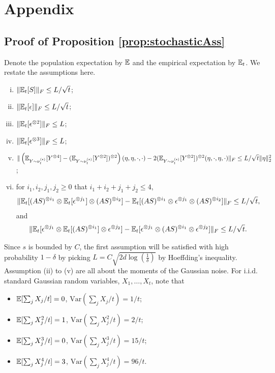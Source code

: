 \onecolumn

\section{Appendix}
\label{sec:Appendix}

\subsection{Proof of Proposition \ref{prop:stochasticAss}}
Denote the population expectation by $\mathbb{E}$ and the empirical expectation by $\mathbb{E}_t$. We restate the assumptions here.
\begin{enumerate}[(i).]
\vspace{-3mm}
\item $\| \mathbb{E}_t[S] \|_F\le L/\sqrt{t}$;
\item $\| \mathbb{E}_t[\epsilon] \|_F \le L/\sqrt{t}$;
\item $\| \mathbb{E}_t[\epsilon^{\otimes 2}] \|_F \le L$;
\item $\| \mathbb{E}_t[\epsilon^{\otimes 3}] \|_F \le L$;
\item $\| \left(\mathbb{E}_{Y\sim \nu_t^{(\epsilon)}} [Y^{\otimes4}] - (\mathbb{E}_{Y\sim \nu_t^{(\epsilon)}} [Y^{\otimes2}])^{\otimes 2}\right)(\eta,\eta,\cdot,\cdot)  - 2 (\mathbb{E}_{Y\sim \nu_t^{(\epsilon)}} [Y^{\otimes2}])^{\otimes 2}(\eta,\cdot,\eta,\cdot)\|_F\le L/\sqrt{t} \|\eta\|_2^2$;
\item for $i_1,i_2,j_1,j_2 \ge 0$ that $i_1+i_2+j_1+j_2 \le 4$,  
\begin{align*}
\| \mathbb{E}_t[(AS)^{\otimes i_1} \otimes \mathbb{E}_t[\epsilon^{\otimes j_1}] \otimes (AS)^{\otimes i_2}] - \mathbb{E}_t[(AS)^{\otimes i_1}\otimes \epsilon^{\otimes j_1}\otimes (AS)^{\otimes i_2}]  \|_F \le L/\sqrt{t},
\end{align*}
and 
\begin{align*}
\| \mathbb{E}_t[\epsilon^{\otimes j_1} \otimes \mathbb{E}_t[(AS)^{\otimes i_1}] \otimes \epsilon^{\otimes j_2}] - \mathbb{E}_t[ \epsilon^{\otimes j_1}\otimes (AS)^{\otimes i_1}\otimes \epsilon^{\otimes j_2}]  \|_F \le L/\sqrt{t}.
\end{align*}
\end{enumerate}
Since $s$ is bounded by $C$, the first assumption will be satisfied with high probability $1-\delta$ by picking $L = C\sqrt{2d\log(\frac{1}{\delta})}$ by Hoeffding's inequality. Assumption (ii) to (v) are all about the moments of the Gaussian noise. 
For i.i.d. standard Gaussian random variables, $X_1, \ldots, X_t$, note that
\begin{itemize}
\item $ \mathbb{E}[\sum_j X_j/t] = 0$, $\text{Var}(\sum_j X_j/t) = 1/t$;
\item $ \mathbb{E}[\sum_j X_j^2/t] = 1$, $\text{Var}(\sum_j X_j^2/t) = 2/t$;
\item $ \mathbb{E}[\sum_j X_j^3/t] = 0$, $\text{Var}(\sum_j X_j^3/t) = 15/t$;
\item $ \mathbb{E}[\sum_j X_j^4/t] = 3$, $\text{Var}(\sum_j X_j^4/t) = 96/t$.
\end{itemize}

